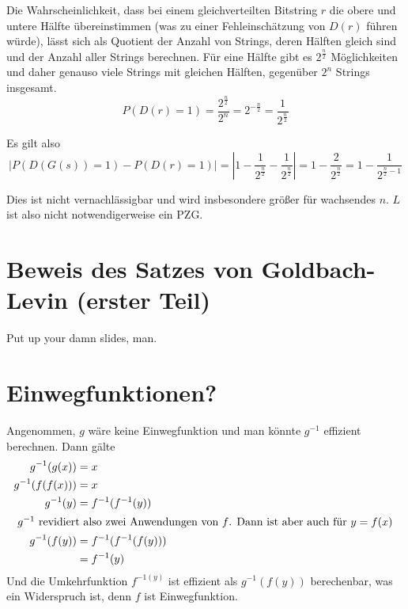 \documentclass{../crypto}
\begin{document}
Die Wahrscheinlichkeit, dass bei einem gleichverteilten Bitstring $r$ die obere
und untere Hälfte übereinstimmen (was zu einer Fehleinschätzung von $D(r)$
führen würde), lässt sich als Quotient der Anzahl von Strings, deren Hälften
gleich sind und der Anzahl aller Strings berechnen. Für eine Hälfte gibt es
$2^{\frac{n}{2}}$ Möglichkeiten und daher genauso viele Strings mit gleichen
Hälften, gegenüber $2^n$ Strings insgesamt.
\begin{equation*}
   P(D(r) = 1) = \frac{2^{\frac{n}{2}}}{2^n} = 2^{-\frac{n}{2}} = \frac{1}{2^\frac{n}{2}}
\end{equation*}

Es gilt also 
\begin{equation*}
   |P(D(G(s)) = 1) - P(D(r) = 1)| = |1 - \frac{1}{2^\frac{n}{2}} -
   \frac{1}{2^\frac{n}{2}}| = 1 - \frac{2}{2^{\frac{n}{2}}} = 1 -
   \frac{1}{2^{\frac{n}{2} - 1}}
\end{equation*}

Dies ist nicht vernachlässigbar und wird insbesondere größer für wachsendes $n$.
$L$ ist also nicht notwendigerweise ein PZG.

\section{Beweis des Satzes von Goldbach-Levin (erster Teil)}

Put up your damn slides, man.

\section{Einwegfunktionen?}

Angenommen, $g$ wäre keine Einwegfunktion und man könnte $g^{-1}$ effizient
berechnen. Dann gälte 
\begin{align*}
   g^{-1}(g(x)) &= x \\
   g^{-1}(f(f(x))) &= x \\
   g^{-1}(y) &= f^{-1}(f^{-1}(y)) \\
   \intertext{
      $g^{-1}$ revidiert also zwei Anwendungen von $f$. Dann ist aber auch
      für $y=f(x)$
   }
   g^{-1}(f(y)) &= f^{-1}(f^{-1}(f(y))) \\
                &= f^{-1}(y)
\end{align*}
Und die Umkehrfunktion $f^{-1(y)}$ ist effizient als $g^{-1}(f(y))$ berechenbar,
was ein Widerspruch ist, denn $f$ ist Einwegfunktion.
\end{document}
